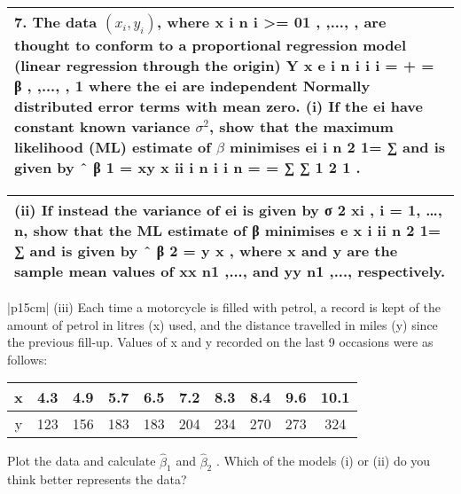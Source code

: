 \documentclass[a4paper,12pt]{article}
\begin{document}
\begin{table}[ht!]
     \centering
     \begin{tabular}{|p{15cm}|}
     \hline        
7. The data $( x_i, y_i)$, where x i n i >= 01 , ,..., , are thought to conform to a proportional regression model (linear regression through the origin)
Y x e i n i i i = + = β , ,..., , 1
where the ei are independent Normally distributed error terms with mean zero.
(i) If the ei have constant known variance 
$\sigma^2$, show that the maximum likelihood (ML)
estimate of 
$\beta$
 minimises ei i n 2 1= ∑ and is given by
ˆ β 1 =
xy
x
ii
i
n
i
i
n =
=
∑
∑
1
2
1
.

\\ \hline
      \end{tabular}
    \end{table}
    
  \begin{table}[ht!]
     \centering
     \begin{tabular}{|p{15cm}|}
     \hline  
(ii) If instead the variance of ei is given by 
σ
2
xi ,  i = 1, …, n,  show that the
ML estimate of 
β
 minimises 
e x i ii n 2 1= ∑ and is given by
ˆ β 2 =   
y x
,
where x and y are the sample mean values of xx n1 ,..., and yy n1 ,..., respectively. \\ \hline 
      \end{tabular}
    \end{table}
    
    
  \begin{table}[ht!]
     \centering
     \begin{tabular}{|p{15cm}|}
     \hline  
(iii) Each time a motorcycle is filled with petrol, a record is kept of the amount of petrol in litres (x) used, and the distance travelled in miles (y) since the previous fill-up. Values of x and y recorded on the last 9 occasions were as follows:
\begin{center}
 \begin{tabular}{|c||c|c|c|c|c|c|c|c|c|} \hline 
x & 4.3 & 4.9 & 5.7 & 6.5 & 7.2& 8.3 &8.4 &9.6 &10.1\\ \hline 
y & 123 & 156 & 183 & 183 & 204 & 234& 270 & 273 & 324\\ \hline 
\end{tabular}
   
\end{center}

Plot the data and calculate $\hat{\beta}_1$ and $\hat{\beta}_2$ .  Which of the models (i) or (ii) do you think better represents the data? 
\\ \hline
      \end{tabular}
    \end{table}
\end{document}
